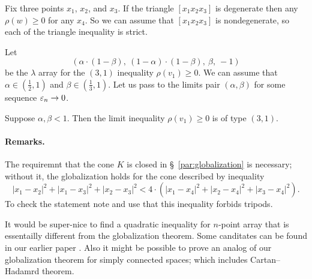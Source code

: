 \documentclass[a4paper,10pt]{article}
\begin{document}
Fix three points $x_1$, $x_2$, and $x_3$.
If the triangle $[x_1x_2x_3]$ is degenerate then any $\rho(w)\ge0$ for any $x_4$.
So we can assume that $[x_1x_2x_3]$ is nondegenerate, so each of the triangle inequality is strict.



Let \[(\alpha\cdot (1-\beta),\  (1-\alpha)\cdot(1-\beta),\  \beta,\ -1)\]
be the $\lambda$ array for the $(3,1)$ inequality $\rho(v_1)\ge 0$.
We can assume that $\alpha\in (\tfrac12,1)$ and $\beta\in(\tfrac13,1)$.
Let us pass to the limits pair $(\alpha,\beta)$ for some sequence $\varepsilon_n\to0$.

Suppose $\alpha,\beta<1$.
Then the limit inequality $\rho(v_1)\ge 0$ is of type $(3,1)$.

\qeds

\paragraph{Remarks.}
The requiremnt that the cone $K$ is closed in §~\ref{par:globalization} is necessary;
without it, the globalization holds for the cone described by inequality
\[|x_1-x_2|^2+|x_1-x_3|^2+|x_2-x_3|^2<4\cdot(|x_1-x_4|^2+|x_2-x_4|^2+|x_3-x_4|^2).\]
To check the statement note and use that this inequality forbids tripods.

It would be super-nice to find a quadratic inequality for $n$-point array that is essentailly different from the globalization theorem.
Some canditates can be found in our earlier paper \cite{lebedeva-petrunin-zolotov}.
Also it might be possible to prove an analog of our globalization theorem for simply connected spaces; which includes Cartan--Hadamrd theorem.

{\sloppy
\def\emph{\textit}
\printbibliography[heading=bibintoc]
\fussy
}
\end{document}

